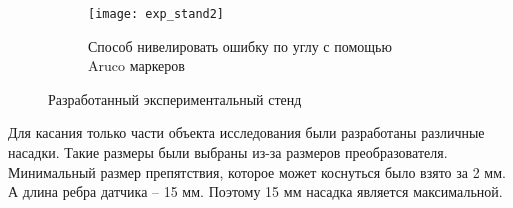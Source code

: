 \begin{figure}[h]
\begin{center}
        \begin{subfigure}{0.5\textwidth}
            \centering\texttt{[image: exp\_stand2]}
            \caption{Способ нивелировать ошибку по углу с помощью Aruco маркеров}
            \label{fig:exp_stand2}
        \end{subfigure}
        \caption{Разработанный экспериментальный стенд}
    \end{center}
\end{figure}

Для касания только части объекта исследования были разработаны различные насадки. Такие размеры были выбраны из-за размеров преобразователя. Минимальный размер препятствия, которое может коснуться было взято за 2 мм. А длина ребра датчика -- 15 мм. Поэтому 15 мм насадка является максимальной.

